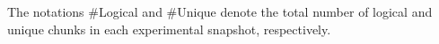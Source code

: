 \begin{table}[!t]
\raggedright
    The notations \#Logical and \#Unique denote the total number of logical and unique chunks in each experimental snapshot, respectively. 
\end{table}



%
%
